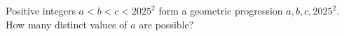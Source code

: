 Positive integers $a<b<c<2025^2$ form a geometric progression $a,b,c,2025^2$. How many distinct values of $a$ are possible?
